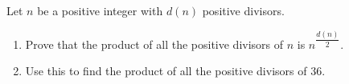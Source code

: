 Let $n$ be a positive integer with $d(n)$ positive divisors.
\begin{enumerate}
\item[(a)] Prove that the product of all the positive divisors of $n$ is $n^{\dfrac{d(n)}{2}}$.
\item[(b)] Use this to find the product of all the positive divisors of $36$.
\end{enumerate}
